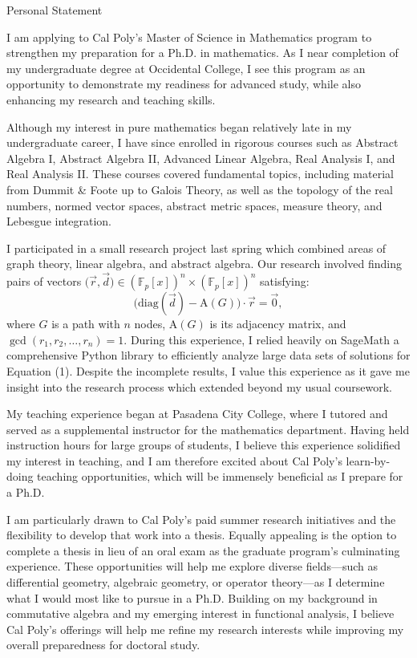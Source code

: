 \documentclass[11pt]{article}
\begin{document}
\begin{center}
    Personal Statement
\end{center}

I am applying to Cal Poly's Master of Science in Mathematics program to strengthen my preparation for a Ph.D. in mathematics. As I near completion of my undergraduate degree at Occidental College, I see this program as an opportunity to demonstrate my readiness for advanced study, while also enhancing my research and teaching skills.

Although my interest in pure mathematics began relatively late in my undergraduate career, I have since enrolled in rigorous courses such as Abstract Algebra I, Abstract Algebra II, Advanced Linear Algebra, Real Analysis I, and Real Analysis II. These courses covered fundamental topics, including material from Dummit \& Foote up to Galois Theory, as well as the topology of the real numbers, normed vector spaces, abstract metric spaces, measure theory, and Lebesgue integration. 

I participated in a small research project last spring which combined areas of graph theory, linear algebra, and abstract algebra. Our research involved finding pairs of vectors $\bigl(\vec{r},\vec{d}\bigr) \in (\mathbb{F}_p[x])^n \times (\mathbb{F}_p[x])^n$ satisfying:
\begin{equation}
        \bigl(\text{diag}(\vec{d}) - \text{A}(G)\bigr)\cdot\vec{r} = \vec{0},
\end{equation}
where $G$ is a path with $n$ nodes, $\text{A}(G)$ is its adjacency matrix, and $\gcd(r_1,r_2,\dots,r_n) = 1$. During this experience, I relied heavily on SageMath \textemdash a comprehensive Python library \textemdash to efficiently analyze large data sets of solutions for Equation (1). Despite the incomplete results, I value this experience as it gave me insight into the research process which extended beyond my usual coursework.

My teaching experience began at Pasadena City College, where I tutored and served as a supplemental instructor for the mathematics department. Having held instruction hours for large groups of students, I believe this experience solidified my interest in teaching, and I am therefore excited about Cal Poly's learn-by-doing teaching opportunities, which will be immensely beneficial as I prepare for a Ph.D.

I am particularly drawn to Cal Poly's paid summer research initiatives and the flexibility to develop that work into a thesis. Equally appealing is the option to complete a thesis in lieu of an oral exam as the graduate program's culminating experience. These opportunities will help me explore diverse fields—such as differential geometry, algebraic geometry, or operator theory—as I determine what I would most like to pursue in a Ph.D. Building on my background in commutative algebra and my emerging interest in functional analysis, I believe Cal Poly's offerings will help me refine my research interests while improving my overall preparedness for doctoral study.
\end{document}
